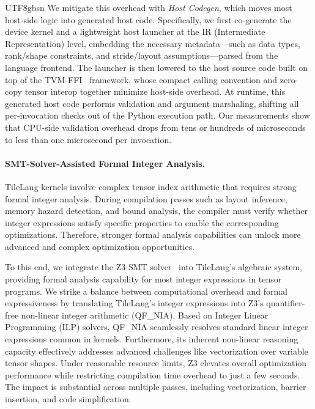 \documentclass[11pt, a4paper, logo, copyright, nonumbering]{deepseek}
\begin{document}
\begin{CJK*}{UTF8}{gbsn}
We mitigate this overhead with \textit{Host Codegen}, which moves most host-side logic into generated host code. Specifically, we first co-generate the device kernel and a lightweight host launcher at the IR (Intermediate Representation) level, embedding the necessary metadata—such as data types, rank/shape constraints, and stride/layout assumptions—parsed from the language frontend. The launcher is then lowered to the host source code built on top of the TVM-FFI~\citep{tvm} framework, whose compact calling convention and zero-copy tensor interop together minimize host-side overhead. At runtime, this generated host code performs validation and argument marshaling, shifting all per‑invocation checks out of the Python execution path. Our measurements show that CPU-side validation overhead drops from tens or hundreds of microseconds to less than one microsecond per invocation.

\paragraph{SMT-Solver-Assisted Formal Integer Analysis.}
TileLang kernels involve complex tensor index arithmetic that requires strong formal integer analysis.
During compilation passes such as layout inference, memory hazard detection, and bound analysis, the compiler must verify whether integer expressions satisfy specific properties to enable the corresponding optimizations.
Therefore, stronger formal analysis capabilities can unlock more advanced and complex optimization opportunities.

To this end, we integrate the Z3 SMT solver~\citep{demoura2008z3} into TileLang's algebraic system, providing formal analysis capability for most integer expressions in tensor programs. 
We strike a balance between computational overhead and formal expressiveness by translating TileLang's integer expressions into Z3's quantifier-free non-linear integer arithmetic (QF\_NIA).
Based on Integer Linear Programming (ILP) solvers, QF\_NIA seamlessly resolves standard linear integer expressions common in kernels.
Furthermore, its inherent non-linear reasoning capacity effectively addresses advanced challenges like vectorization over variable tensor shapes.
Under reasonable resource limits, Z3 elevates overall optimization performance while restricting compilation time overhead to just a few seconds.
The impact is substantial across multiple passes, including vectorization, barrier insertion, and code simplification.


\end{CJK*}
\end{document}
